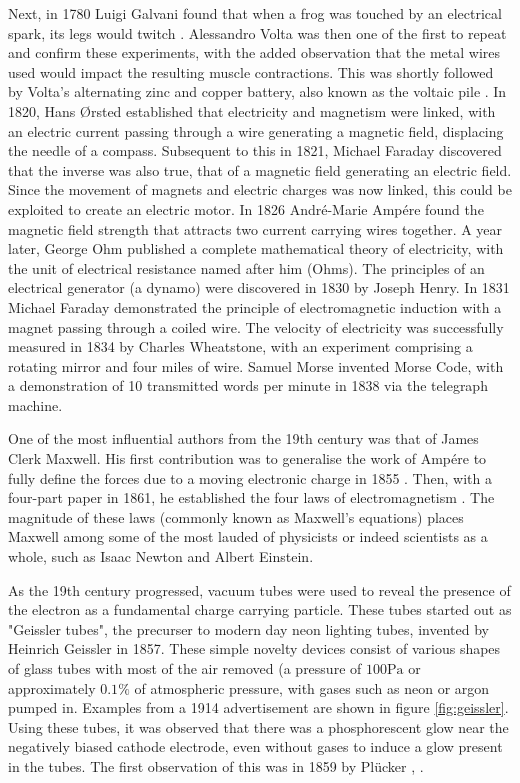 Next, in 1780 Luigi Galvani found that when a frog was touched by an electrical spark, its legs would twitch \cite{whittaker1953}. Alessandro Volta was then one of the first to repeat and confirm these experiments, with the added observation that the metal wires used would impact the resulting muscle contractions. This was shortly followed by Volta's alternating zinc and copper battery, also known as the voltaic pile \cite{guarnieri2014}. In 1820, Hans {\O}rsted established that electricity and magnetism were linked, with an electric current passing through a wire generating a magnetic field, displacing the needle of a compass. Subsequent to this in 1821, Michael Faraday discovered that the inverse was also true, that of a magnetic field generating an electric field. Since the movement of magnets and electric charges was now linked, this could be exploited to create an electric motor. In 1826 Andr{\'e}-Marie Amp{\'e}re found the magnetic field strength that attracts two current carrying wires together. A year later, George Ohm published a complete mathematical theory of electricity, with the unit of electrical resistance named after him (Ohms). The principles of an electrical generator (a dynamo) were discovered in 1830 by Joseph Henry. In 1831 Michael Faraday demonstrated the principle of electromagnetic induction with a magnet passing through a coiled wire. The velocity of electricity was successfully measured in 1834 by Charles Wheatstone, with an experiment comprising a rotating mirror and four miles of wire. Samuel Morse invented Morse Code, with a demonstration of 10 transmitted words per minute in 1838 via the telegraph machine.

One of the most influential authors from the 19th century was that of James Clerk Maxwell. His first contribution was to generalise the work of Amp{\'e}re to fully define the forces due to a moving electronic charge in 1855 \cite{maxwell1890}. Then, with a four-part paper in 1861, he established the four laws of electromagnetism \cite{maxwell2010}. The magnitude of these laws (commonly known as Maxwell's equations) places Maxwell among some of the most lauded of physicists or indeed scientists as a whole, such as Isaac Newton and Albert Einstein.

As the 19th century progressed, vacuum tubes were used to reveal the presence of the electron as a fundamental charge carrying particle. These tubes started out as "Geissler tubes", the precurser to modern day neon lighting tubes, invented by Heinrich Geissler in 1857. These simple novelty devices consist of various shapes of glass tubes with most of the air removed (a pressure of $100\si{\pascal}$ or approximately $0.1\%$ of atmospheric pressure, with gases such as neon or argon pumped in. Examples from a 1914 advertisement are shown in figure \ref{fig:geissler}. Using these tubes, it was observed that there was a phosphorescent glow near the negatively biased cathode electrode, even without gases to induce a glow present in the tubes. The first observation of this was in 1859  by Pl{\"u}cker \cite{plucker1859}, \cite{plucker1862}.

